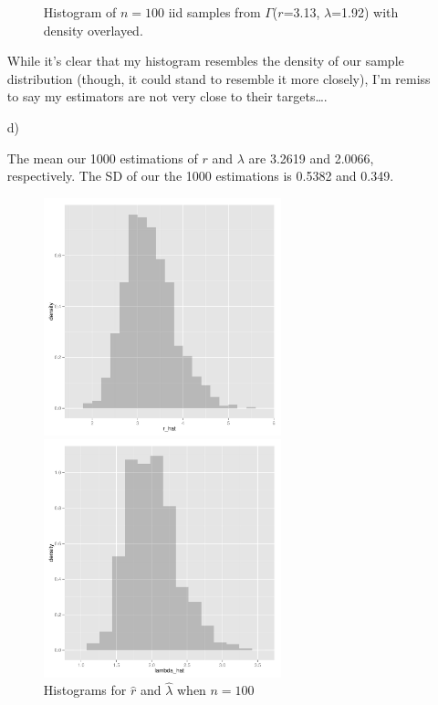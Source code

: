 \documentclass{article}\usepackage{graphicx, color}
\newenvironment{knitrout}{}{} %
\begin{document}
\begin{enumerate}
\begin{figure}[htb]
\caption{Histogram of $n = 100$ iid samples from $\Gamma$($r$=3.13, $\lambda$=1.92) with density overlayed.}
\end{figure}

While it's clear that my histogram resembles the density of our sample distribution (though, it could stand to resemble it more closely), I'm remiss to say my estimators are not very close to their targets\ldots. 

\item[d)]



The mean our 1000 estimations of $r$ and $\lambda$ are 3.2619 and 2.0066, respectively. The SD of our the 1000 estimations is 0.5382 and 0.349.  

\begin{figure}[ht!]
\centering
\begin{knitrout}
\color{fgcolor}\includegraphics[width=0.65\textwidth]{figure/partDPlots} 
\end{knitrout}

\begin{knitrout}
\color{fgcolor}\includegraphics[width=0.65\textwidth]{figure/partDPlots2} 
\end{knitrout}

\caption{Histograms for $\hat{r}$ and $\hat{\lambda}$ when $n=100$}
\end{figure}
\end{enumerate}
\end{document}
